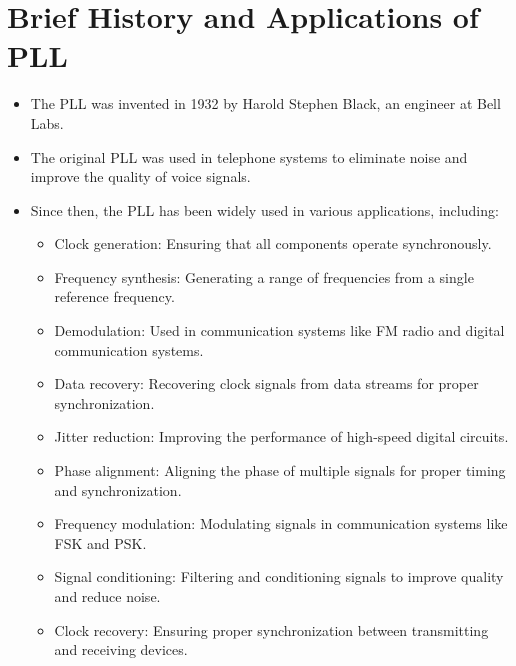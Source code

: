 \section{Brief History and Applications of PLL}
\begin{itemize}
    \item The PLL was invented in 1932 by Harold Stephen Black, an engineer at Bell Labs.
    \item The original PLL was used in telephone systems to eliminate noise and improve the quality of voice signals.
    \item Since then, the PLL has been widely used in various applications, including:
    \begin{itemize}
        \item Clock generation: Ensuring that all components operate synchronously.
        \item Frequency synthesis: Generating a range of frequencies from a single reference frequency.
        \item Demodulation: Used in communication systems like FM radio and digital communication systems.
        \item Data recovery: Recovering clock signals from data streams for proper synchronization.
        \item Jitter reduction: Improving the performance of high-speed digital circuits.
        \item Phase alignment: Aligning the phase of multiple signals for proper timing and synchronization.
        \item Frequency modulation: Modulating signals in communication systems like FSK and PSK.
        \item Signal conditioning: Filtering and conditioning signals to improve quality and reduce noise.
        \item Clock recovery: Ensuring proper synchronization between transmitting and receiving devices.
    \end{itemize}
\end{itemize}

